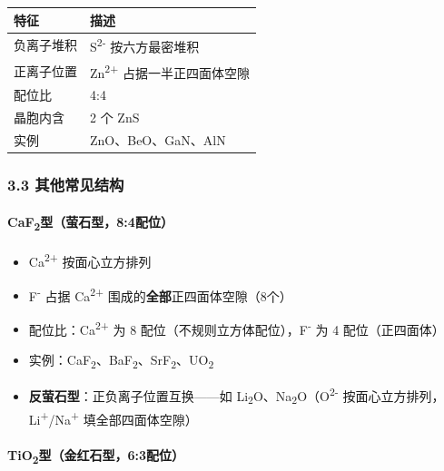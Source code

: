 {\def\LTcaptype{none} %
\begin{longtable}[]{@{}ll@{}}
\toprule\noalign{}
特征 & 描述 \\
\midrule\noalign{}
\endhead
\bottomrule\noalign{}
\endlastfoot
负离子堆积 & S\textsuperscript{2-} 按六方最密堆积 \\
正离子位置 & Zn\textsuperscript{2+} 占据一半正四面体空隙 \\
配位比 & 4:4 \\
晶胞内含 & 2 个 ZnS \\
实例 & ZnO、BeO、GaN、AlN \\
\end{longtable}
}

\subsubsection{3.3 其他常见结构}\label{ux5176ux4ed6ux5e38ux89c1ux7ed3ux6784}

\paragraph{\texorpdfstring{CaF\textsubscript{2}型（萤石型，8:4配位）}{CaF2型（萤石型，8:4配位）}}\label{caf2ux578bux8424ux77f3ux578b84ux914dux4f4d}

\begin{itemize}
\tightlist
\item
  Ca\textsuperscript{2+} 按面心立方排列
\item
  F\textsuperscript{-} 占据 Ca\textsuperscript{2+} 围成的\textbf{全部}正四面体空隙（8个）
\item
  配位比：Ca\textsuperscript{2+} 为 8 配位（不规则立方体配位），F\textsuperscript{-} 为 4 配位（正四面体）
\item
  实例：CaF\textsubscript{2}、BaF\textsubscript{2}、SrF\textsubscript{2}、UO\textsubscript{2}
\item
  \textbf{反萤石型}：正负离子位置互换------如 Li\textsubscript{2}O、Na\textsubscript{2}O（O\textsuperscript{2-} 按面心立方排列，Li\textsuperscript{+}/Na\textsuperscript{+} 填全部四面体空隙）
\end{itemize}

\paragraph{\texorpdfstring{TiO\textsubscript{2}型（金红石型，6:3配位）}{TiO2型（金红石型，6:3配位）}}\label{tio2ux578bux91d1ux7ea2ux77f3ux578b63ux914dux4f4d}

